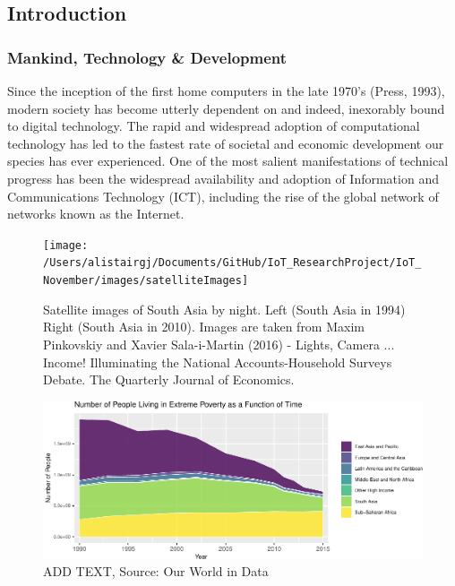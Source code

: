 \documentclass[11pt,]{article}
\begin{document}
\hypertarget{introduction}{%
\subsection{Introduction}\label{introduction}}

\hypertarget{mankind-technology-development}{%
\subsubsection{Mankind, Technology \&
Development}\label{mankind-technology-development}}

Since the inception of the first home computers in the late 1970's
(Press, 1993), modern society has become utterly dependent on and
indeed, inexorably bound to digital technology. The rapid and widespread
adoption of computational technology has led to the fastest rate of
societal and economic development our species has ever experienced. One
of the most salient manifestations of technical progress has been the
widespread availability and adoption of Information and Communications
Technology (ICT), including the rise of the global network of networks
known as the Internet.

\begin{figure}[H]

{\centering \texttt{[image: /Users/alistairgj/Documents/GitHub/IoT\_ResearchProject/IoT\_November/images/satelliteImages]} 

}

\caption{Satellite images of South Asia by night. Left (South Asia in 1994) Right (South Asia in 2010). Images are taken from Maxim Pinkovskiy and Xavier Sala-i-Martin (2016) - Lights, Camera ... Income! Illuminating the National Accounts-Household Surveys Debate. The Quarterly Journal of Economics.}\label{fig:satelliteImagesAsia}
\end{figure}

\begin{figure}[H]

{\centering \includegraphics{MD_Final_files/figure-latex/globalPovertyPlot-1} 

}

\caption{ADD TEXT, Source: Our World in Data}\label{fig:globalPovertyPlot}
\end{figure}
\end{document}
